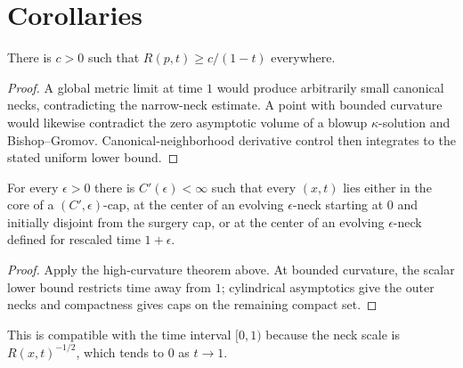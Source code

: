 \section{Corollaries}
\begin{proposition}
\label{prop:standard-solution-scalar-curvature-lower-bound}
\label{Restim}
There is $c>0$ such that $R(p,t)\ge c/(1-t)$ everywhere.
\end{proposition}
\begin{proof}
\sketch A global metric limit at time $1$ would produce arbitrarily small
canonical necks, contradicting the narrow-neck estimate. A point with bounded
curvature would likewise contradict the zero asymptotic volume of a blowup
$\kappa$-solution and Bishop--Gromov. Canonical-neighborhood derivative
control then integrates to the stated uniform lower bound.
\end{proof}

\begin{theorem}
\label{thm:standard-solution-trichotomy}
\label{stdsolncannbhd}
For every $\epsilon>0$ there is $C'(\epsilon)<\infty$ such that every
$(x,t)$ lies either in the core of a $(C',\epsilon)$-cap, at the center
of an evolving $\epsilon$-neck starting at $0$ and initially disjoint from
the surgery cap, or at the center of an evolving $\epsilon$-neck defined
for rescaled time $1+\epsilon$.
\end{theorem}
\begin{proof}
\sketch Apply the high-curvature theorem above. At bounded curvature, the
scalar lower bound restricts time away from $1$; cylindrical asymptotics give
the outer necks and compactness gives caps on the remaining compact set.
\end{proof}

\begin{remark}
\label{rem:evolving-neck-rescaled-time}
This is compatible with the time interval $[0,1)$ because the neck scale is
$R(x,t)^{-1/2}$, which tends to $0$ as $t\to1$.
\end{remark}

